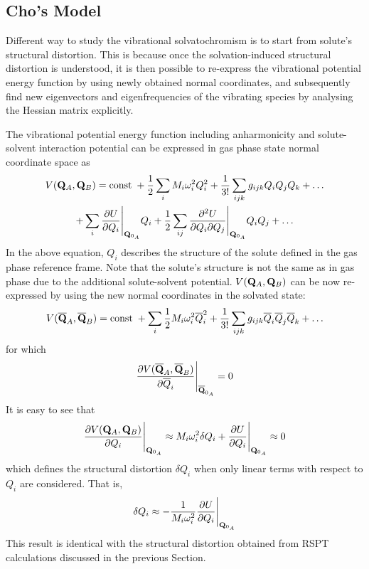 \documentclass[b5paper,oneside,fleqn,11pt]{book}
\begin{document}
\begin{refsection}
\section{Cho's Model\label{s:cho-model}}

Different way to study the vibrational solvatochromism is to start from
solute's structural distortion. 
This is because once the solvation-induced structural distortion is 
understood, it is then possible to re-express the vibrational potential energy function
by using newly obtained normal coordinates, and subsequently find new eigenvectors and eigenfrequencies
of the vibrating species by analysing the Hessian matrix explicitly.

The vibrational potential energy function including anharmonicity 
and solute\hyp{}sol\-vent interaction potential
can be expressed in gas phase state normal coordinate space as
%
\begin{multline} \label{e:vib-pot-energy-function}
 V({\bf Q}_A,{\bf Q}_B) = {\rm const}\;+
\frac{1}{2} \sum_i M_i \omega_i^2 Q_i^2 + \frac{1}{3!} \sum_{ijk}  g_{ijk} Q_iQ_jQ_k + \ldots \\
+ \sum_i \frac{\partial U}{\partial Q_i} \Bigg|_{{\bf Q}_{0_A}} Q_i
+ \frac{1}{2} \sum_{ij} \frac{\partial^2 U}{\partial Q_i \partial Q_j} \Bigg|_{{\bf Q}_{0_A}} Q_iQ_j
+ \ldots
\end{multline}
%
In the above equation, $Q_i$ describes the structure of the solute
defined in the gas phase reference frame. Note that the solute's structure 
is not the same as in gas phase due to the additional solute\hyp{}solvent potential.
$V({\bf Q}_A,{\bf Q}_B)$ can be now re-expressed by using the new normal coordinates in the solvated
state:
%
\begin{equation} \label{e:vib-pot-energy-function-new}
V(\overline{{\bf Q}}_A,\overline{{\bf Q}}_B) = {\rm const}\;+
\sum_i \frac{1}{2} M_i \omega_i^2 \overline{Q}_i^2 + 
\frac{1}{3!} \sum_{ijk}  g_{ijk} \overline{Q}_i\overline{Q}_j\overline{Q}_k + \ldots
\end{equation}
%
for which 
%
\begin{equation} \label{e:vib-pot-energy-function-new.condition}
\frac{\partial V(\overline{{\bf Q}}_A,\overline{{\bf Q}}_B)}
{\partial \overline{Q}_i} \Bigg|_{{\bf \overline{Q}}_{0_A}} = 0
\end{equation}
%
It is easy to see that
%
\begin{equation} \label{e:x863}
\frac{\partial V({{\bf Q}}_A,{{\bf Q}}_B)}
{\partial Q_i} \Bigg|_{{\bf Q}_{0_A}} \approx 
M_i \omega_i^2 \delta Q_i + \frac{\partial U}{\partial Q_i} \Bigg|_{{\bf Q}_{0_A}} 
\approx 0
\end{equation}
%
which defines the structural distortion $\delta Q_i$ when only linear terms with respect to $Q_i$
are considered. That is,
%
\begin{equation} \label{e:struct-dist-cho}
\delta Q_i \approx - \frac{1}{M_i \omega_i^2} \frac{\partial U}{\partial Q_i} \Bigg|_{{\bf Q}_{0_A}} 
\end{equation}
%
This result is identical with the structural distortion
obtained from RSPT calculations discussed in the previous Section.


\end{refsection}
\end{document}
